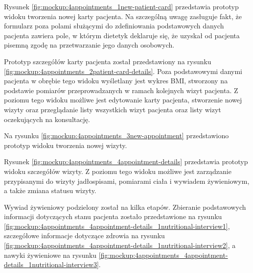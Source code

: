 
Rysunek \ref{fig:mockup:4appointments_1new-patient-card} przedstawia prototyp widoku tworzenia nowej karty pacjenta.
Na szczególną uwagę zasługuje fakt, że formularz poza polami służącymi do zdefiniowania podstawowych danych pacjenta zawiera pole,
w którym dietetyk deklaruje się, że uzyskał od pacjenta pisemną zgodę na przetwarzanie jego danych osobowych.


Prototyp szczegółów karty pacjenta został przedstawiony na rysunku \ref{fig:mockup:4appointments_2patient-card-details}.
Poza podstawowymi danymi pacjenta w obrębie tego widoku wyśletlany jest wykres BMI, stworzony na podstawie pomiarów przeprowadzanych w ramach kolejnych wizyt pacjenta.
Z poziomu tego widoku możliwe jest edytowanie karty pacjenta, stworzenie nowej wizyty oraz przeglądanie listy wszystkich wizyt pacjenta oraz listy wizyt oczekujących na konsultację.


Na rysunku \ref{fig:mockup:4appointments_3new-appointment} przedstawiono prototyp widoku tworzenia nowej wizyty.


Rysunek \ref{fig:mockup:4appointments_4appointment-details} przedstawia prototyp widoku szczegółów wizyty.
Z poziomu tego widoku możliwe jest zarządzanie przypisanymi do wizyty jadłospisami, pomiarami ciała i wywiadem żywieniowym, a także zmiana statusu wizyty.


Wywiad żywieniowy podzielony został na kilka etapów. Zbieranie podstawowych informacji dotyczących stanu pacjenta zostało przedstawione na rysunku \ref{fig:mockup:4appointments_4appointment-details_1nutritional-interview1},
szczegółowe informacje dotyczące zdrowia na rysunku \ref{fig:mockup:4appointments_4appointment-details_1nutritional-interview2}, a nawyki żywieniowe na rysunku \ref{fig:mockup:4appointments_4appointment-details_1nutritional-interview3}.

